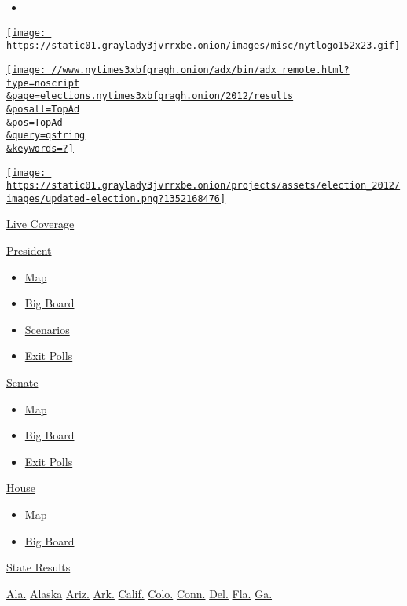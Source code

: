 \begin{itemize}
\item
\end{itemize}

\href{//www.nytimes3xbfgragh.onion}{\texttt{[image: https://static01.graylady3jvrrxbe.onion/images/misc/nytlogo152x23.gif]}}

\href{//www.nytimes3xbfgragh.onion/adx/bin/adx_click.html?type=cookie\&pos=TopAd}{\texttt{[image: //www.nytimes3xbfgragh.onion/adx/bin/adx\_remote.html?type=noscript\\\&page=elections.nytimes3xbfgragh.onion/2012/results\\\&posall=TopAd\\\&pos=TopAd\\\&query=qstring\\\&keywords=?]}}

\href{president.html}{\texttt{[image: https://static01.graylady3jvrrxbe.onion/projects/assets/election\_2012/images/updated-election.png?1352168476]}}

\href{live-coverage.html}{Live Coverage}

\href{president.html}{President}

\begin{itemize}
\tightlist
\item
  \href{president.html}{Map}
\item
  \href{president/big-board.html}{Big Board}
\item
  \href{president/scenarios.html}{Scenarios}
\item
  \href{president/exit-polls.html}{Exit Polls}
\end{itemize}

\href{senate.html}{Senate}

\begin{itemize}
\tightlist
\item
  \href{senate.html}{Map}
\item
  \href{senate/big-board.html}{Big Board}
\item
  \href{senate/exit-polls.html}{Exit Polls}
\end{itemize}

\href{house.html}{House}

\begin{itemize}
\tightlist
\item
  \href{house.html}{Map}
\item
  \href{house/big-board.html}{Big Board}
\end{itemize}

\protect\hyperlink{}{State Results}

\href{states/alabama.html}{Ala.} \href{states/alaska.html}{Alaska}
\href{states/arizona.html}{Ariz.} \href{states/arkansas.html}{Ark.}
\href{states/california.html}{Calif.} \href{states/colorado.html}{Colo.}
\href{states/connecticut.html}{Conn.} \href{states/delaware.html}{Del.}
\href{states/florida.html}{Fla.} \href{states/georgia.html}{Ga.}

